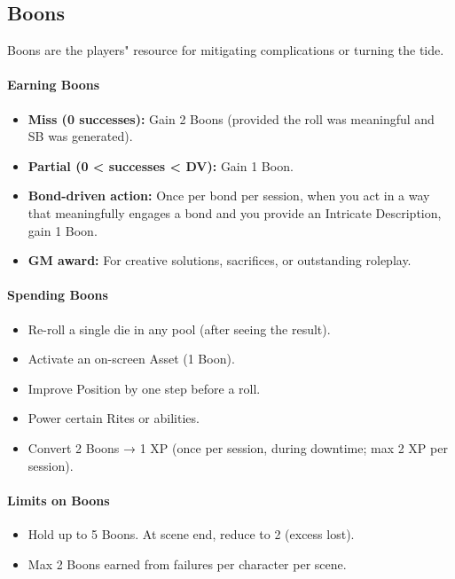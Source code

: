 \subsection{Boons}
Boons are the players" resource for mitigating complications or turning the tide.

\paragraph{Earning Boons}
\begin{itemize}
  \item \textbf{Miss (0 successes):} Gain 2 Boons (provided the roll was meaningful and SB was generated).
  \item \textbf{Partial (0 < successes < DV):} Gain 1 Boon.
  \item \textbf{Bond-driven action:} Once per bond per session, when you act in a way that meaningfully engages a bond and you provide an Intricate Description, gain 1 Boon.
  \item \textbf{GM award:} For creative solutions, sacrifices, or outstanding roleplay.
\end{itemize}

\paragraph{Spending Boons}
\begin{itemize}
  \item Re-roll a single die in any pool (after seeing the result).
  \item Activate an on-screen Asset (1 Boon).
  \item Improve Position by one step before a roll.
  \item Power certain Rites or abilities.
  \item Convert 2 Boons → 1 XP (once per session, during downtime; max 2 XP per session).
\end{itemize}

\paragraph{Limits on Boons}
\begin{itemize}
  \item Hold up to 5 Boons. At scene end, reduce to 2 (excess lost).
  \item Max 2 Boons earned from failures per character per scene.
\end{itemize}

